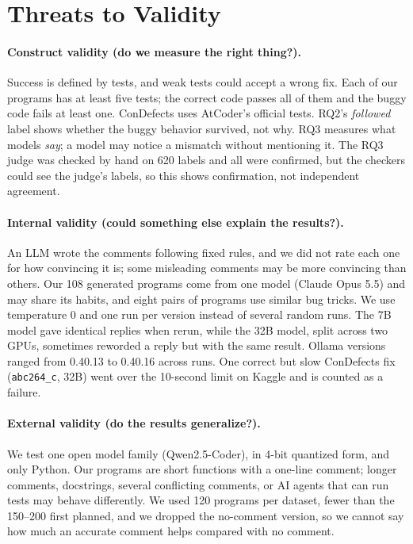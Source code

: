 \documentclass[sigconf,nonacm]{acmart}
\newcommand{\cd}{ConDefects}
\begin{document}
\section{Threats to Validity}
\label{sec:threats}

\paragraph{Construct validity (do we measure the right thing?).} Success is defined by tests, and weak tests could accept a wrong fix. Each of our programs has at least five tests; the correct code passes all of them and the buggy code fails at least one. \cd{} uses AtCoder's official tests. RQ2's \emph{followed} label shows whether the buggy behavior survived, not why. RQ3 measures what models \emph{say}; a model may notice a mismatch without mentioning it. The RQ3 judge was checked by hand on 620 labels and all were confirmed, but the checkers could see the judge's labels, so this shows confirmation, not independent agreement.

\paragraph{Internal validity (could something else explain the results?).} An LLM wrote the comments following fixed rules, and we did not rate each one for how convincing it is; some misleading comments may be more convincing than others. Our 108 generated programs come from one model (Claude Opus 5.5) and may share its habits, and eight pairs of programs use similar bug tricks. We use temperature 0 and one run per version instead of several random runs. The 7B model gave identical replies when rerun, while the 32B model, split across two GPUs, sometimes reworded a reply but with the same result. Ollama versions ranged from 0.40.13 to 0.40.16 across runs. One correct but slow \cd{} fix (\texttt{abc264\_c}, 32B) went over the 10-second limit on Kaggle and is counted as a failure.

\paragraph{External validity (do the results generalize?).} We test one open model family (Qwen2.5-Coder), in 4-bit quantized form, and only Python. Our programs are short functions with a one-line comment; longer comments, docstrings, several conflicting comments, or AI agents that can run tests may behave differently. We used 120 programs per dataset, fewer than the 150--200 first planned, and we dropped the no-comment version, so we cannot say how much an accurate comment helps compared with no comment.
\end{document}
